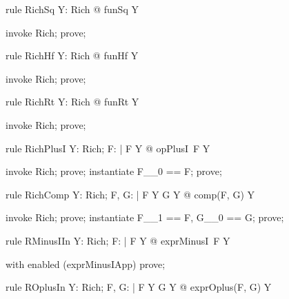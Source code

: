 \documentclass{article}
\begin{document}
\begin{theorem}{rule RichSq}
  \forall Y: Rich @ funSq \in Y
\end{theorem}

\begin{zproof}
invoke Rich;
prove;
\end{zproof}

\begin{theorem}{rule RichHf}
  \forall Y: Rich @ funHf \in Y
\end{theorem}

\begin{zproof}
invoke Rich;
prove;
\end{zproof}

\begin{theorem}{rule RichRt}
  \forall Y: Rich @ funRt \in Y
\end{theorem}

\begin{zproof}
invoke Rich;
prove;
\end{zproof}

\begin{theorem}{rule RichPlusI}
  \forall Y: Rich; F: \nat \fun \nat | F \in Y @ opPlusI~F \in Y
\end{theorem}

\begin{zproof}
invoke Rich;
prove;
instantiate F\_\_0 == F;
prove;
\end{zproof}

\begin{theorem}{rule RichComp}
  \forall Y: Rich; F, G: \nat \fun \nat | F \in Y \land G \in Y @ comp(F, G) \in Y
\end{theorem}

\begin{zproof}
invoke Rich;
prove;
instantiate F\_\_1 == F, G\_\_0 == G;
prove;
\end{zproof}

\begin{theorem}{rule RMinusIIn}
  \forall Y: Rich; F: \nat \fun \nat | F \in Y @ exprMinusI~F \in Y
\end{theorem}

\begin{zproof}
with enabled (exprMinusIApp) prove;
\end{zproof}

\begin{theorem}{rule ROplusIn}
  \forall Y: Rich; F, G: \nat \fun \nat | F \in Y \land G \in Y @ exprOplus(F, G) \in Y
\end{theorem}
\end{document}
